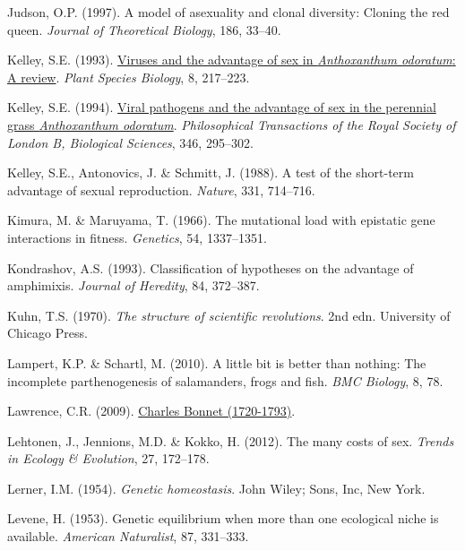 \documentclass[
  letterpaper,
]{book}
\newlength{\cslhangindent}
\newenvironment{CSLReferences}[2] %
 {\begin{list}{}{%
  \setlength{\itemindent}{0pt}
  \setlength{\leftmargin}{0pt}
  \setlength{\parsep}{0pt}
  \ifodd #1
   \setlength{\leftmargin}{\cslhangindent}
   \setlength{\itemindent}{-1\cslhangindent}
  \fi
  \setlength{\itemsep}{#2\baselineskip}}}
 {\end{list}}
\begin{document}
\begin{CSLReferences}{1}{0}
Judson, O.P. (1997). A model of asexuality and clonal diversity: Cloning
the red queen. \emph{Journal of Theoretical Biology}, 186, 33--40.

Kelley, S.E. (1993).
\href{https://doi.org/10.1111/j.1442-1984.1993.tb00072.x}{Viruses and
the advantage of sex in \emph{{A}nthoxanthum odoratum}: A review}.
\emph{Plant Species Biology}, 8, 217--223.

Kelley, S.E. (1994). \href{https://doi.org/10.1098/rstb.1994.0146}{Viral
pathogens and the advantage of sex in the perennial grass
\emph{{A}nthoxanthum odoratum}}. \emph{Philosophical Transactions of the
Royal Society of London B, Biological Sciences}, 346, 295--302.

Kelley, S.E., Antonovics, J. \& Schmitt, J. (1988). A test of the
short-term advantage of sexual reproduction. \emph{Nature}, 331,
714--716.

Kimura, M. \& Maruyama, T. (1966). The mutational load with epistatic
gene interactions in fitness. \emph{Genetics}, 54, 1337--1351.

Kondrashov, A.S. (1993). Classification of hypotheses on the advantage
of amphimixis. \emph{Journal of Heredity}, 84, 372--387.

Kuhn, T.S. (1970). \emph{The structure of scientific revolutions}. 2nd
edn. University of Chicago Press.

Lampert, K.P. \& Schartl, M. (2010). A little bit is better than
nothing: The incomplete parthenogenesis of salamanders, frogs and fish.
\emph{BMC Biology}, 8, 78.

Lawrence, C.R. (2009). \href{https://hdl.handle.net/10776/1745}{{Charles
Bonnet} (1720-1793)}.

Lehtonen, J., Jennions, M.D. \& Kokko, H. (2012). The many costs of sex.
\emph{Trends in Ecology \& Evolution}, 27, 172--178.

Lerner, I.M. (1954). \emph{Genetic homeostasis}. John Wiley; Sons, Inc,
New York.

Levene, H. (1953). Genetic equilibrium when more than one ecological
niche is available. \emph{American Naturalist}, 87, 331--333.


\end{CSLReferences}
\end{document}

